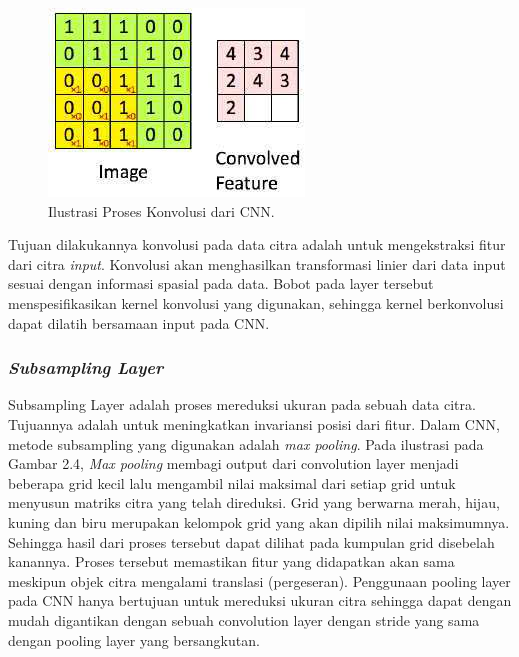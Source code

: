 \begin{figure}[ht]
  \centering

  \includegraphics[scale=0.8]{gambar/konvolusi-cnn.jpg}

  \caption{Ilustrasi Proses Konvolusi dari CNN.}
  \label{fig:convolutional-neural-network}
\end{figure}

Tujuan dilakukannya konvolusi pada data citra adalah untuk mengekstraksi fitur dari citra \emph{input}. Konvolusi akan menghasilkan transformasi linier dari data input sesuai dengan
informasi spasial pada data. Bobot pada layer tersebut menspesifikasikan kernel konvolusi yang digunakan, sehingga kernel berkonvolusi dapat
dilatih bersamaan input pada CNN.

\subsubsection{\emph{Subsampling Layer}}
\label{subsec:subsampling-layer}

Subsampling Layer adalah proses mereduksi ukuran pada sebuah data citra. Tujuannya adalah untuk meningkatkan invariansi posisi dari fitur.
Dalam CNN, metode subsampling yang digunakan adalah \emph{max pooling}. Pada ilustrasi pada Gambar 2.4, \emph{Max pooling} membagi output
dari convolution layer menjadi beberapa grid kecil lalu mengambil
nilai maksimal dari setiap grid untuk menyusun matriks citra yang
telah direduksi. Grid yang berwarna merah, hijau, kuning dan biru merupakan kelompok grid yang akan dipilih nilai maksimumnya.
Sehingga hasil dari proses tersebut dapat dilihat pada kumpulan
grid disebelah kanannya. Proses tersebut memastikan fitur yang
didapatkan akan sama meskipun objek citra mengalami translasi
(pergeseran). Penggunaan pooling layer pada CNN hanya bertujuan untuk mereduksi ukuran citra sehingga dapat dengan mudah
digantikan dengan sebuah convolution layer dengan stride yang sama dengan pooling layer yang bersangkutan.


